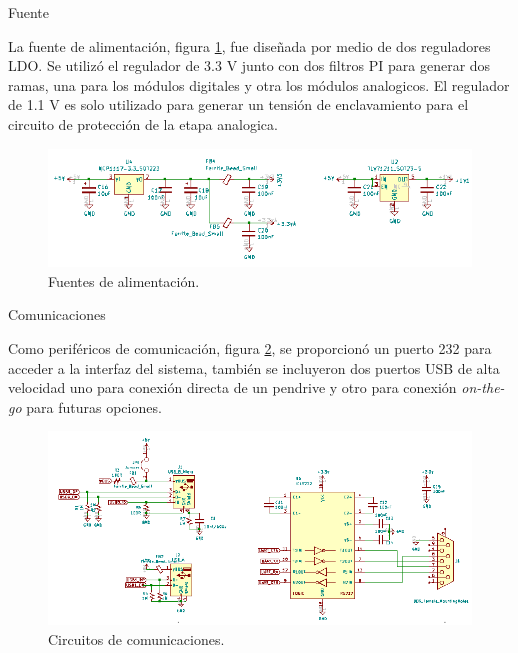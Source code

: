 \vspace{15mm}

Fuente

La fuente de alimentación, figura \ref{fig:schPwr}, fue diseñada por medio de dos reguladores LDO. Se utilizó el regulador de 3.3 V junto con dos filtros PI para generar dos ramas, una para los módulos digitales y otra los módulos analogicos. El regulador de 1.1 V es solo utilizado para generar un tensión de enclavamiento para el circuito de protección de la etapa analogica.


\begin{figure}[ht]
	\centering
	\includegraphics[width=140mm]{./Figures/schPwr.png}
	\caption{Fuentes de alimentación.}
	\label{fig:schPwr}
\end{figure}

\vspace{10mm}

Comunicaciones

Como periféricos de comunicación, figura \ref{fig:schCom}, se proporcionó un puerto 232 para acceder a la interfaz del sistema, también se incluyeron dos puertos USB de alta velocidad uno para conexión directa de un pendrive y otro para conexión \textit{on-the-go} para futuras opciones.

\begin{figure}[ht]
	\centering
	\includegraphics[width=140mm]{./Figures/schCom.png}
	\caption{Circuitos de comunicaciones.}
	\label{fig:schCom}
\end{figure}

\newpage

